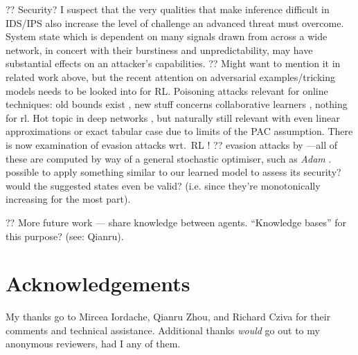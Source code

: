 \documentclass[conference, letterpaper, 10pt, times]{IEEEtran}
\begin{document}
?? Security? I suspect that the very qualities that make inference difficult in IDS/IPS also increase the level of challenge an advanced threat must overcome.
System state which is dependent on many signals drawn from across a wide network, in concert with their burstiness and unpredictability, may have substantial effects on an attacker's capabilities.
?? Might want to mention it in related work above, but the recent attention on adversarial examples/tricking models needs to be looked into for RL. Poisoning attacks relevant for online techniques: old bounds exist \textcite{DBLP:journals/jmlr/KloftL10}, new stuff concerns collaborative learners \cite{DBLP:conf/acsac/ShenTS16}, nothing for rl. Hot topic in deep networks \cite{DBLP:conf/eurosp/PapernotMJFCS16, DBLP:conf/eurosp/PapernotMSW18}, but naturally still relevant with even linear approximations or exact tabular case due to limits of the PAC assumption. There is now examination of evasion attacks wrt.\ RL \cite{DBLP:journals/corr/HuangPGDA17}!
?? evasion attacks by \textcite{DBLP:conf/sp/Carlini017}---all of these are computed by way of a general stochastic optimiser, such as \emph{Adam} \cite{DBLP:journals/corr/KingmaB14}. possible to apply something similar to our learned model to assess its security? would the suggested states even be valid? (i.e. since they're monotonically increasing for the most part).

?? More future work --- share knowledge between agents. ``Knowledge bases'' for this purpose? (see: Qianru).

\section*{Acknowledgements}
My thanks go to Mircea Iordache, Qianru Zhou, and Richard Cziva for their comments and technical assistance.
Additional thanks \emph{would} go out to my anonymous reviewers, had I any of them.

\renewcommand*{\bibfont}{\small}
\printbibliography
\end{document}
